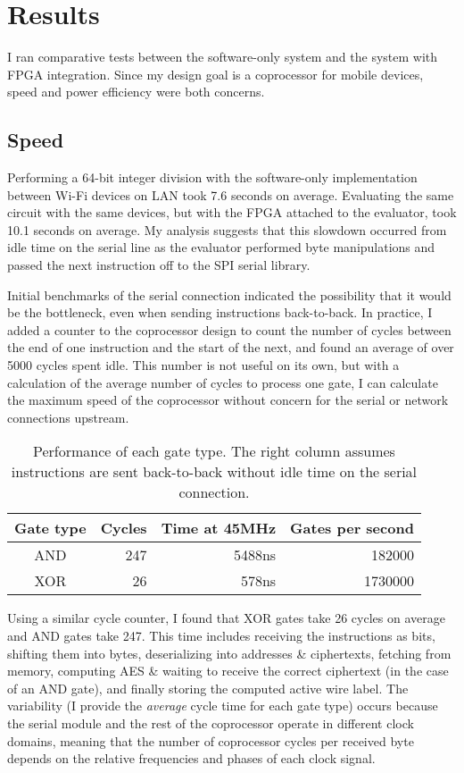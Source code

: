 \section{Results}
I ran comparative tests between the software-only system and the system with FPGA integration. Since my design goal is a coprocessor for mobile devices, speed and power efficiency were both concerns.

\subsection{Speed}
Performing a 64-bit integer division with the software-only implementation between Wi-Fi devices on LAN took 7.6 seconds on average. Evaluating the same circuit with the same devices, but with the FPGA attached to the evaluator, took 10.1 seconds on average. My analysis suggests that this slowdown occurred from idle time on the serial line as the evaluator performed byte manipulations and passed the next instruction off to the SPI serial library.

Initial benchmarks of the serial connection indicated the possibility that it would be the bottleneck, even when sending instructions back-to-back. In practice, I added a counter to the coprocessor design to count the number of cycles between the end of one instruction and the start of the next, and found an average of over 5000 cycles spent idle. This number is not useful on its own, but with a calculation of the average number of cycles to process one gate, I can calculate the maximum speed of the coprocessor without concern for the serial or network connections upstream.

\begin{table}
	\centering
	\begin{tabular}{c r r r}
		\toprule
		Gate type & Cycles & Time at 45MHz & Gates per second\\
		\midrule
		AND       &    247 &        5488ns &  182000\\
		XOR       &     26 &         578ns & 1730000\\
		\bottomrule
	\end{tabular}
	\caption{Performance of each gate type. The right column assumes instructions are sent back-to-back without idle time on the serial connection.}%
	\label{tab:perf}
\end{table}

Using a similar cycle counter, I found that XOR gates take 26 cycles on average and AND gates take 247. This time includes receiving the instructions as bits, shifting them into bytes, deserializing into addresses \& ciphertexts, fetching from memory, computing AES \& waiting to receive the correct ciphertext (in the case of an AND gate), and finally storing the computed active wire label. The variability (I provide the \textit{average} cycle time for each gate type) occurs
because the serial module and the rest of the coprocessor operate in different clock domains, meaning that the number of coprocessor cycles per received byte depends on the relative frequencies and phases of each clock signal.


